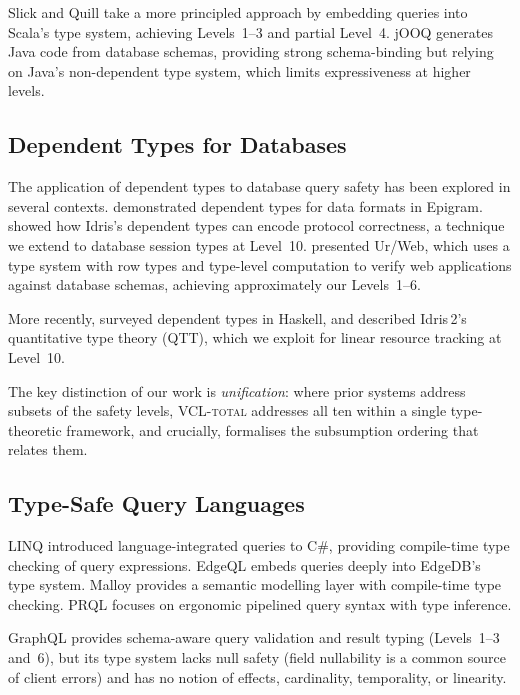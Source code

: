 \documentclass[11pt,a4paper]{article}
\newcommand{\VCL}{\textsc{VCL-total}}
\begin{document}
Slick \citep{slick2023docs} and Quill \citep{ioffe2017quill}
take a more principled approach by embedding queries into Scala's type
system, achieving Levels~1--3 and partial Level~4.  jOOQ
\citep{jooq2023docs} generates Java code from database schemas,
providing strong schema-binding but relying on Java's non-dependent
type system, which limits expressiveness at higher levels.

\subsection{Dependent Types for Databases}

The application of dependent types to database query safety has been
explored in several contexts.  \citet{oury2008power} demonstrated
dependent types for data formats in Epigram.
\citet{brady2013idris} showed how Idris's dependent types can encode
protocol correctness, a technique we extend to database session types
at Level~10.  \citet{chlipala2010ur} presented Ur/Web, which uses a
type system with row types and type-level computation to verify web
applications against database schemas, achieving approximately our
Levels~1--6.

More recently, \citet{weirich2017dependent} surveyed dependent types in
Haskell, and \citet{cockx2021idris2} described Idris\,2's quantitative
type theory (QTT), which we exploit for linear resource tracking at
Level~10.

The key distinction of our work is \emph{unification}: where prior
systems address subsets of the safety levels, \VCL{} addresses all ten
within a single type-theoretic framework, and crucially, formalises the
subsumption ordering that relates them.

\subsection{Type-Safe Query Languages}

LINQ \citep{meijer2006linq} introduced language-integrated queries to
C\#, providing compile-time type checking of query expressions.
EdgeQL \citep{edgedb2023docs} embeds queries deeply into EdgeDB's
type system.  Malloy \citep{malloy2023docs} provides a semantic
modelling layer with compile-time type checking.  PRQL
\citep{prql2023docs} focuses on ergonomic pipelined query syntax with
type inference.

GraphQL \citep{graphql2023spec} provides schema-aware query validation
and result typing (Levels~1--3 and~6), but its type system lacks null
safety (field nullability is a common source of client errors) and has
no notion of effects, cardinality, temporality, or linearity.
\end{document}
